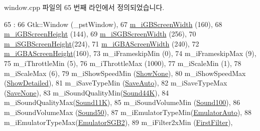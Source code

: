 window.\+cpp 파일의 65 번째 라인에서 정의되었습니다.


\begin{DoxyCode}
65                                                                      :
66   Gtk::Window       (\_pstWindow),
67   \mbox{\hyperlink{class_v_b_a_1_1_window_ab87ef83b1c563956f2ccb79f465e60a5}{m\_iGBScreenWidth}}  (160),
68   \mbox{\hyperlink{class_v_b_a_1_1_window_ad87b6a11eafd636e92c7a24af249af36}{m\_iGBScreenHeight}} (144),
69   \mbox{\hyperlink{class_v_b_a_1_1_window_af01e947f6f9a8fce2de3df5f0420d066}{m\_iSGBScreenWidth}} (256),
70   \mbox{\hyperlink{class_v_b_a_1_1_window_adc64e75d94960c2a9d0680465a838b5d}{m\_iSGBScreenHeight}}(224),
71   \mbox{\hyperlink{class_v_b_a_1_1_window_a9a7257c8edba5383674c7a7eea250679}{m\_iGBAScreenWidth}} (240),
72   \mbox{\hyperlink{class_v_b_a_1_1_window_a5029d02ff8ee7d81fa7e9ad210d537d6}{m\_iGBAScreenHeight}}(160),
73   m\_iFrameskipMin   (0),
74   m\_iFrameskipMax   (9),
75   m\_iThrottleMin    (5),
76   m\_iThrottleMax    (1000),
77   m\_iScaleMin       (1),
78   m\_iScaleMax       (6),
79   m\_iShowSpeedMin   (\mbox{\hyperlink{class_v_b_a_1_1_window_a9dfcf6d1a23c7576d357221d4bedda45af272aa72487b69bcd8b10a1e257c9b6d}{ShowNone}}),
80   m\_iShowSpeedMax   (\mbox{\hyperlink{class_v_b_a_1_1_window_a9dfcf6d1a23c7576d357221d4bedda45a95a319265dead31c372adea02dd872ed}{ShowDetailed}}),
81   m\_iSaveTypeMin    (\mbox{\hyperlink{class_v_b_a_1_1_window_a299f71905bca4f89a8df627dd25dafa5a40d647f47d41de9e41920bf1ae468127}{SaveAuto}}),
82   m\_iSaveTypeMax    (\mbox{\hyperlink{class_v_b_a_1_1_window_a299f71905bca4f89a8df627dd25dafa5a646edadc2bc0272b5a461dd4dc681bd9}{SaveNone}}),
83   m\_iSoundQualityMin(\mbox{\hyperlink{class_v_b_a_1_1_window_a320f2aa064d602888b12cdd2ebfbb3c8a7217e9ed9810a4897c3d3b60d9aa8812}{Sound44K}}),
84   m\_iSoundQualityMax(\mbox{\hyperlink{class_v_b_a_1_1_window_a320f2aa064d602888b12cdd2ebfbb3c8ae48098f9ed61e7a8daa78de6d3ebcebc}{Sound11K}}),
85   m\_iSoundVolumeMin (\mbox{\hyperlink{class_v_b_a_1_1_window_a50ce3c1e3f6a9ce3ed41b5c2a5535115a6ab8db10fff1e9cf79007e97aaa72e28}{Sound100}}),
86   m\_iSoundVolumeMax (\mbox{\hyperlink{class_v_b_a_1_1_window_a50ce3c1e3f6a9ce3ed41b5c2a5535115ae418399aca07a338a64219a63c715f2c}{Sound50}}),
87   m\_iEmulatorTypeMin(\mbox{\hyperlink{class_v_b_a_1_1_window_ac8b20507b5006b2ce37db6a76ea69b55a0da4980e7039131ee7aeac335cdccd08}{EmulatorAuto}}),
88   m\_iEmulatorTypeMax(\mbox{\hyperlink{class_v_b_a_1_1_window_ac8b20507b5006b2ce37db6a76ea69b55a1f9a966afd03becfa990992c7da7769f}{EmulatorSGB2}}),
89   m\_iFilter2xMin    (\mbox{\hyperlink{class_v_b_a_a1683020d7324daf3bda627d0d3658e3ea3c843b4e248ec6fa85c8f864fdd5d627}{FirstFilter}}),

\end{DoxyCode}
